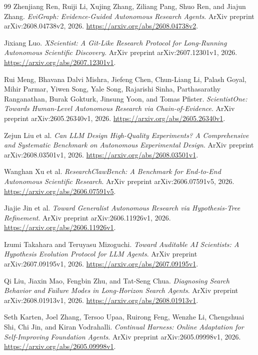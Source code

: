 \documentclass[11pt,a4paper]{article}
\begin{document}
\begin{thebibliography}{99}
Zhenjiang Ren, Ruiji Li, Xujing Zhang, Ziliang Pang, Shuo Ren, and Jiajun Zhang.
\emph{EviGraph: Evidence-Guided Autonomous Research Agents}.
ArXiv preprint arXiv:2608.04738v2, 2026.
\url{https://arxiv.org/abs/2608.04738v2}.

Jixiang Luo.
\emph{XScientist: A Git-Like Research Protocol for Long-Running Autonomous
Scientific Discovery}.
ArXiv preprint arXiv:2607.12301v1, 2026.
\url{https://arxiv.org/abs/2607.12301v1}.

Rui Meng, Bhavana Dalvi Mishra, Jiefeng Chen, Chun-Liang Li, Palash Goyal,
Mihir Parmar, Yiwen Song, Yale Song, Rajarishi Sinha, Parthasarathy Ranganathan,
Burak Gokturk, Jinsung Yoon, and Tomas Pfister.
\emph{ScientistOne: Towards Human-Level Autonomous Research via Chain-of-Evidence}.
ArXiv preprint arXiv:2605.26340v1, 2026.
\url{https://arxiv.org/abs/2605.26340v1}.

Zejun Liu et al.
\emph{Can LLM Design High-Quality Experiments? A Comprehensive and Systematic
Benchmark on Autonomous Experimental Design}.
ArXiv preprint arXiv:2608.03501v1, 2026.
\url{https://arxiv.org/abs/2608.03501v1}.

Wanghan Xu et al.
\emph{ResearchClawBench: A Benchmark for End-to-End Autonomous Scientific
Research}.
ArXiv preprint arXiv:2606.07591v5, 2026.
\url{https://arxiv.org/abs/2606.07591v5}.

Jiajie Jin et al.
\emph{Toward Generalist Autonomous Research via Hypothesis-Tree Refinement}.
ArXiv preprint arXiv:2606.11926v1, 2026.
\url{https://arxiv.org/abs/2606.11926v1}.

Izumi Takahara and Teruyasu Mizoguchi.
\emph{Toward Auditable AI Scientists: A Hypothesis Evolution Protocol for LLM
Agents}.
ArXiv preprint arXiv:2607.09195v1, 2026.
\url{https://arxiv.org/abs/2607.09195v1}.

Qi Liu, Jiaxin Mao, Fengbin Zhu, and Tat-Seng Chua.
\emph{Diagnosing Search Behavior and Failure Modes in Long-Horizon Search
Agents}.
ArXiv preprint arXiv:2608.01913v1, 2026.
\url{https://arxiv.org/abs/2608.01913v1}.

Seth Karten, Joel Zhang, Tersoo Upaa, Ruirong Feng, Wenzhe Li, Chengshuai Shi,
Chi Jin, and Kiran Vodrahalli.
\emph{Continual Harness: Online Adaptation for Self-Improving Foundation Agents}.
ArXiv preprint arXiv:2605.09998v1, 2026.
\url{https://arxiv.org/abs/2605.09998v1}.


\end{thebibliography}
\end{document}
